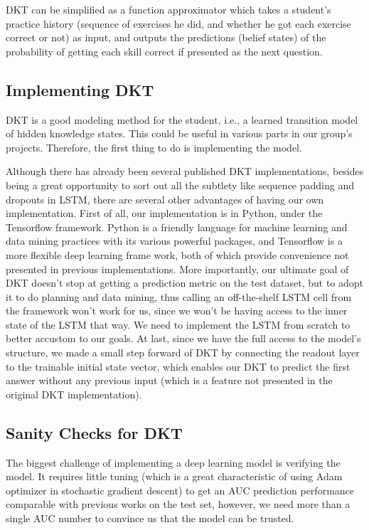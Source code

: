 DKT can be simplified as a function approximator which takes a student's practice history (sequence of exercises he did, and whether he got each exercise correct or not) as input, and outputs the predictions (belief states) of the probability of getting each skill correct if presented as the next question.

\subsection{Implementing DKT}

DKT is a good modeling method for the student, i.e., a learned transition model of hidden knowledge states. This could be useful in various parts in our group's projects. Therefore, the first thing to do is implementing the model. 

Although there has already been several published DKT implementations, besides being a great opportunity to sort out all the subtlety like sequence padding and dropouts in LSTM, there are several other advantages of having our own implementation. First of all, our implementation is in Python, under the Tensorflow framework. Python is a friendly language for machine learning and data mining practices with its various powerful packages, and Tensorflow is a more flexible deep learning frame work, both of which provide convenience not presented in previous implementations. More importantly, our ultimate goal of DKT doesn't stop at getting a prediction metric on the test dataset, but to adopt it to do planning and data mining, thus calling an off-the-shelf LSTM cell from the framework won't work for us, since we won't be having access to the inner state of the LSTM that way. We need to implement the LSTM from scratch to better accustom to our goals. At last, since we have the full access to the model's structure, we made a small step forward of DKT by connecting the readout layer to the trainable initial state vector, which enables our DKT to predict the first answer without any previous input (which is a feature not presented in the original DKT implementation).

\subsection{Sanity Checks for DKT}

The biggest challenge of implementing a deep learning model is verifying the model. It requires little tuning (which is a great characteristic of using Adam optimizer in stochastic gradient descent) to get an AUC prediction performance comparable with previous works on the test set, however, we need more than a single AUC number to convince us that the model can be trusted.

